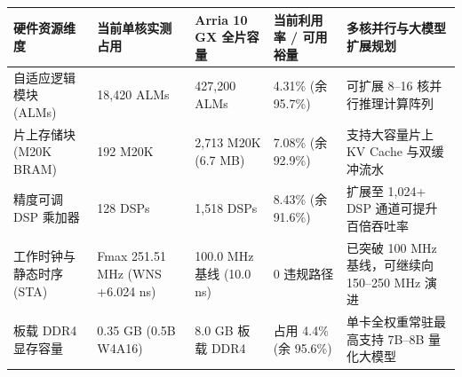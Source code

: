 \documentclass[11pt,a4paper]{article}
\begin{document}
{\footnotesize\renewcommand{\arraystretch}{1.14}\begin{longtable}{@{}L{0.19\textwidth}L{0.16\textwidth}L{0.16\textwidth}L{0.15\textwidth}L{0.24\textwidth}@{}}\toprule

\textbf{硬件资源维度} & \textbf{当前单核实测占用} & \textbf{Arria 10 GX 全片容量} & \textbf{当前利用率 /\allowbreak{} 可用裕量} & \textbf{多核并行与大模型扩展规划}\\\midrule\endhead

自适应逻辑模块 (\allowbreak{}ALMs)\allowbreak{} & 18,\allowbreak{}420 ALMs & 427,\allowbreak{}200 ALMs & 4.31\% (\allowbreak{}余 95.7\%)\allowbreak{} & 可扩展 8–16 核并行推理计算阵列\\[2pt]

片上存储块 (\allowbreak{}M20K BRAM)\allowbreak{} & 192 M20K & 2,\allowbreak{}713 M20K (\allowbreak{}6.7 MB)\allowbreak{} & 7.08\% (\allowbreak{}余 92.9\%)\allowbreak{} & 支持大容量片上 KV Cache 与双缓冲流水\\[2pt]

精度可调 DSP 乘加器 & 128 DSPs & 1,\allowbreak{}518 DSPs & 8.43\% (\allowbreak{}余 91.6\%)\allowbreak{} & 扩展至 1,\allowbreak{}024+\allowbreak{} DSP 通道可提升百倍吞吐率\\[2pt]

工作时钟与静态时序 (\allowbreak{}STA)\allowbreak{} & Fmax 251.51 MHz (\allowbreak{}WNS +\allowbreak{}6.024 ns)\allowbreak{} & 100.0 MHz 基线 (\allowbreak{}10.0 ns)\allowbreak{} & 0 违规路径 & 已突破 100 MHz 基线，可继续向 150–250 MHz 演进\\[2pt]

板载 DDR4 显存容量 & 0.35 GB (\allowbreak{}0.5B W4A16)\allowbreak{} & 8.0 GB 板载 DDR4 & 占用 4.4\% (\allowbreak{}余 95.6\%)\allowbreak{} & 单卡全权重常驻最高支持 7B–8B 量化大模型\\[2pt]

\bottomrule\end{longtable}}
\end{document}
